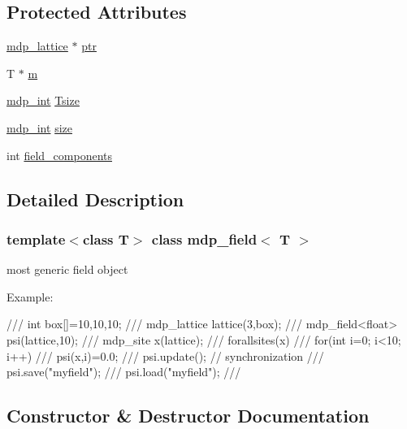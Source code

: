 \subsection*{Protected Attributes}
\begin{DoxyCompactItemize}
\item 
\hyperlink{classmdp__lattice}{mdp\+\_\+lattice} $\ast$ \hyperlink{classmdp__field_aa3e7e522a6e3c47da7ff7075d71f6417}{ptr}
\item 
T $\ast$ \hyperlink{classmdp__field_a4d38ed40feef11c07d751fc276a498fc}{m}
\item 
\hyperlink{mdp__global__vars_8h_aaa1ad9d0dcd2124aa5af0120d9954174}{mdp\+\_\+int} \hyperlink{classmdp__field_aece7eeb6754c5e2ec9f031e352eb6f1f}{Tsize}
\item 
\hyperlink{mdp__global__vars_8h_aaa1ad9d0dcd2124aa5af0120d9954174}{mdp\+\_\+int} \hyperlink{classmdp__field_a3dfa0ff545bed811ad055e46020bed7f}{size}
\item 
int \hyperlink{classmdp__field_a090b0995fcfb15a9e9258b5721b685ba}{field\+\_\+components}
\end{DoxyCompactItemize}


\subsection{Detailed Description}
\subsubsection*{template$<$class T$>$\newline
class mdp\+\_\+field$<$ T $>$}

most generic field object 

Example\+: \begin{DoxyVerb}///    int box[]={10,10,10};
///    mdp_lattice lattice(3,box);
///    mdp_field<float> psi(lattice,10);
///    mdp_site x(lattice);
///    forallsites(x)
///      for(int i=0; i<10; i++)
///         psi(x,i)=0.0;
///    psi.update(); // synchronization
///    psi.save("myfield");
///    psi.load("myfield");
/// \end{DoxyVerb}
 

\subsection{Constructor \& Destructor Documentation}
\mbox{\label{classmdp__field_ab3e16ee58db96391a255579bc89d8535}} 
